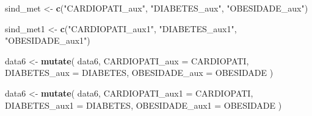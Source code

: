 \documentclass[
]{article}
\newenvironment{Shaded}{\begin{snugshade}}{\end{snugshade}}
\newcommand{\DataTypeTok}[1]{\textcolor[rgb]{0.13,0.29,0.53}{#1}}
\newcommand{\KeywordTok}[1]{\textcolor[rgb]{0.13,0.29,0.53}{\textbf{#1}}}
\newcommand{\NormalTok}[1]{#1}
\newcommand{\StringTok}[1]{\textcolor[rgb]{0.31,0.60,0.02}{#1}}
\begin{document}
\begin{Shaded}
\begin{Highlighting}[]
\NormalTok{sind_met <-}\StringTok{  }\KeywordTok{c}\NormalTok{(}\StringTok{"CARDIOPATI_aux"}\NormalTok{,}
               \StringTok{"DIABETES_aux"}\NormalTok{, }\StringTok{"OBESIDADE_aux"}\NormalTok{)}

\NormalTok{sind_met1 <-}\StringTok{  }\KeywordTok{c}\NormalTok{(}\StringTok{"CARDIOPATI_aux1"}\NormalTok{,}
                \StringTok{"DIABETES_aux1"}\NormalTok{,}
                \StringTok{"OBESIDADE_aux1"}\NormalTok{)}

\NormalTok{data6 <-}
\StringTok{  }\KeywordTok{mutate}\NormalTok{(}
\NormalTok{    data6,}
    \DataTypeTok{CARDIOPATI_aux =}\NormalTok{ CARDIOPATI,}
    \DataTypeTok{DIABETES_aux =}\NormalTok{ DIABETES,}
    \DataTypeTok{OBESIDADE_aux =}\NormalTok{ OBESIDADE}
\NormalTok{  )}

\NormalTok{data6 <-}
\StringTok{  }\KeywordTok{mutate}\NormalTok{(}
\NormalTok{    data6,}
    \DataTypeTok{CARDIOPATI_aux1 =}\NormalTok{ CARDIOPATI,}
    \DataTypeTok{DIABETES_aux1 =}\NormalTok{ DIABETES,}
    \DataTypeTok{OBESIDADE_aux1 =}\NormalTok{ OBESIDADE}
\NormalTok{  )}


\end{Highlighting}
\end{Shaded}
\end{document}
